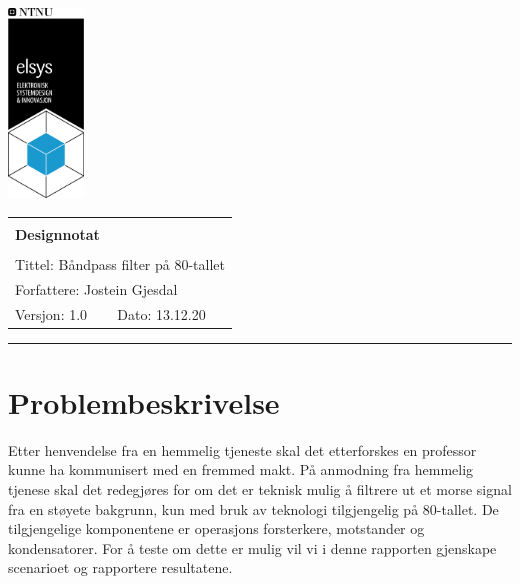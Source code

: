 \documentclass[a4paper,11pt,norsk]{article}
\begin{document}
\begin{minipage}[c]{0.15\textwidth}
\includegraphics[width=2.0cm]{elsys_pos_staaende_ntnu}  
\end{minipage}
\begin{minipage}[c]{0.85\textwidth}

\renewcommand{\arraystretch}{1.7}
\large 
\begin{tabularx}{\textwidth}{|X|X|}
\hline
\multicolumn{2}{|l|}{} \\
\multicolumn{2}{|l|}{\huge \textbf{Designnotat}} \\
\multicolumn{2}{|l|}{}  \\
\hline
\multicolumn{2}{|l|}{Tittel: 
Båndpass filter på 80-tallet
} \\
\hline
\multicolumn{2}{|l|}{Forfattere: 
Jostein Gjesdal
} \\
\hline
Versjon: 1.0 & Dato: 13.12.20
\\
\hline 
\end{tabularx}
\end{minipage}
\normalsize


\setlength{\parskip}{0ex}
\renewcommand{\baselinestretch}{0.1}\normalsize
\tableofcontents
\renewcommand{\baselinestretch}{1.00}\normalsize
\setlength{\parskip}{2ex}
\rule{\textwidth}{1pt}

\section{Problembeskrivelse}
\label{sec:innledning}
Etter henvendelse fra en hemmelig tjeneste skal det etterforskes en professor kunne ha kommunisert med en fremmed makt. På anmodning fra hemmelig tjenese skal det redegjøres for om det er teknisk mulig å filtrere ut et morse signal fra en støyete bakgrunn, kun med bruk av teknologi tilgjengelig på 80-tallet. De tilgjengelige komponentene er operasjons forsterkere, motstander og kondensatorer. For å teste om dette er mulig vil vi i denne rapporten gjenskape scenarioet og rapportere resultatene.
\end{document}
